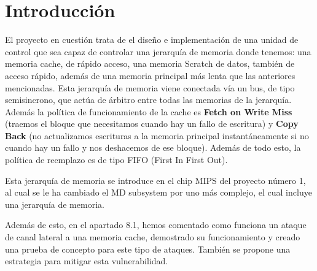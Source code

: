\documentclass{article}
\begin{document}
\newpage

\tableofcontents

\newpage
\section{Introducción}
El proyecto en cuestión trata de el diseño e implementación de una unidad de control que sea capaz de controlar una jerarquía de memoria
donde tenemos: una memoria cache, de rápido acceso, una memoria Scratch de datos, también de acceso rápido, además de una memoria principal más lenta que las anteriores mencionadas.
Esta jerarquía de memoria viene conectada vía un bus, de tipo semisincrono, que actúa de árbitro entre todas las memorias de la jerarquía. Además la política de funcionamiento de la cache es \textbf{Fetch on Write Miss} (traemos el bloque que necesitamos cuando hay un fallo de escritura)
y \textbf{Copy Back} (no actualizamos escrituras a la memoria principal instantáneamente si no cuando hay un fallo y nos deshacemos de ese bloque). Además de todo esto, la política de reemplazo es de tipo FIFO (First In First Out). \par
Esta jerarquía de memoria se introduce en el chip MIPS del proyecto número 1, al cual se le ha cambiado el MD subsystem por uno más complejo, el cual incluye una jerarquía de memoria.\par
Además de esto, en el apartado 8.1, hemos comentado como funciona un ataque de canal lateral a una memoria cache, demostrado su funcionamiento y creado una prueba de concepto para este tipo de ataques. También se propone una estrategia para mitigar esta vulnerabilidad.
\end{document}
